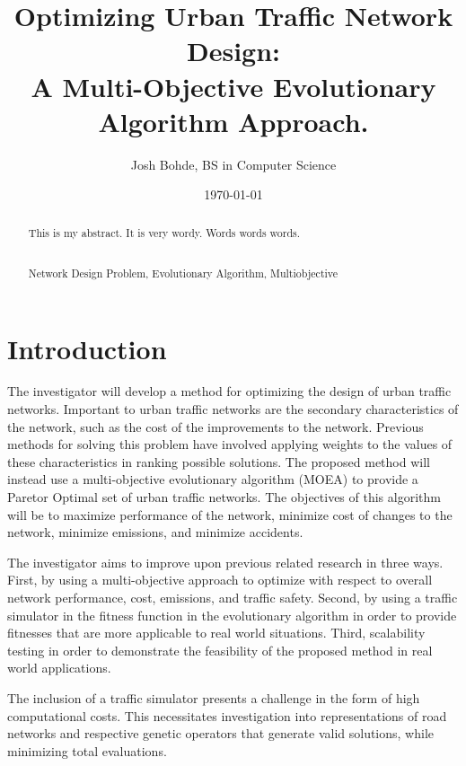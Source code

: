 \documentclass[11pt, oneside, notitlepage, draft]{article}
\newcommand{\keywords}[1]{\par\addvspace\baselineskip
\noindent\enspace\ignorespaces\centering{\bf Keywords}\\#1}
\begin{document}
\title{Optimizing Urban Traffic Network Design:\\ A Multi-Objective Evolutionary Algorithm Approach.}
\author{Josh Bohde, BS in Computer Science}
\date{\today}
\maketitle

\begin{abstract}
This is my abstract. It is very wordy. Words words words.
\keywords{Network Design Problem, Evolutionary Algorithm, Multiobjective}
\end{abstract}

\clearpage
\part{Introduction}
    The investigator will develop a method for optimizing the design of urban traffic networks. Important to urban traffic networks are the secondary characteristics of the network, such as the cost of the improvements to the network. Previous methods for solving this problem have involved applying weights to the values of these characteristics in ranking possible solutions. The proposed method will instead use a multi-objective evolutionary algorithm (MOEA) to provide a Paretor Optimal set of urban traffic networks. The objectives of this algorithm will be to maximize performance of the network, minimize cost of changes to the network, minimize emissions, and minimize accidents.

    The investigator aims to improve upon previous related research in three ways. First, by using a multi-objective approach to optimize with respect to overall network performance, cost, emissions, and traffic safety. Second, by using a traffic simulator in the fitness function in the evolutionary algorithm in order to provide fitnesses that are more applicable to real world situations. Third, scalability testing in order to demonstrate the feasibility of the proposed method in real world applications.

    The inclusion of a traffic simulator presents a challenge in the form of high computational costs. This necessitates investigation into representations of road networks and respective genetic operators that generate valid solutions, while minimizing total evaluations.
\end{document}
